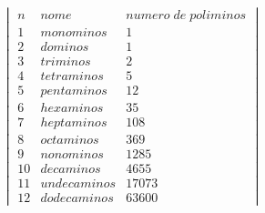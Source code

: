 $
\begin{vmatrix} 
n & nome & numero \; de \; poliminos \\
1 & monominos & 1 \\
2 & dominos & 1 \\
3 & triminos & 2 \\
4 & tetraminos & 5 \\
5 & pentaminos & 12 \\
6 & hexaminos & 35 \\
7 & heptaminos & 108 \\
8 & octaminos & 369 \\
9 & nonominos & 1285 \\
10 & decaminos & 4655 \\
11 & undecaminos & 17073 \\
12 & dodecaminos & 63600
\end{vmatrix}
$
